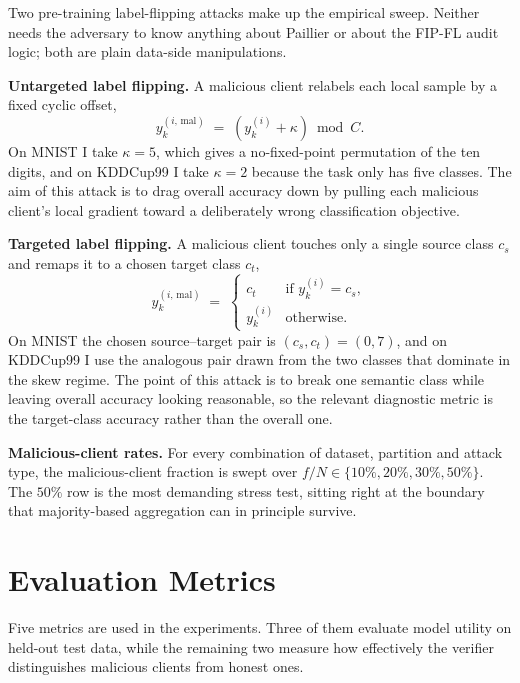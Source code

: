 Two pre-training label-flipping attacks make up the empirical sweep. Neither needs the adversary to know anything about Paillier or about the FIP-FL audit logic; both are plain data-side manipulations.

\noindent\textbf{Untargeted label flipping.} A malicious client relabels each local sample by a fixed cyclic offset,
\begin{equation}
    y_{k}^{(i,\,\text{mal})} \;=\; (y_{k}^{(i)} + \kappa) \bmod C .
\end{equation}
On MNIST I take $\kappa=5$, which gives a no-fixed-point permutation of the ten digits, and on KDDCup99 I take $\kappa=2$ because the task only has five classes. The aim of this attack is to drag overall accuracy down by pulling each malicious client's local gradient toward a deliberately wrong classification objective.

\noindent\textbf{Targeted label flipping.} A malicious client touches only a single source class $c_s$ and remaps it to a chosen target class $c_t$,
\begin{equation}
    y_{k}^{(i,\,\text{mal})} \;=\; \begin{cases}
        c_{t} & \text{if } y_{k}^{(i)} = c_{s}, \\
        y_{k}^{(i)} & \text{otherwise.}
    \end{cases}
\end{equation}
On MNIST the chosen source--target pair is $(c_s,c_t)=(0,7)$, and on KDDCup99 I use the analogous pair drawn from the two classes that dominate in the skew regime. The point of this attack is to break one semantic class while leaving overall accuracy looking reasonable, so the relevant diagnostic metric is the target-class accuracy rather than the overall one.

\noindent\textbf{Malicious-client rates.} For every combination of dataset, partition and attack type, the malicious-client fraction is swept over $f/N\in\{10\%,20\%,30\%,50\%\}$. The $50\%$ row is the most demanding stress test, sitting right at the boundary that majority-based aggregation can in principle survive.

\section{Evaluation Metrics}
\label{sec:setup-metrics}

Five metrics are used in the experiments. Three of them evaluate model utility on held-out test data, while the remaining two measure how effectively the verifier distinguishes malicious clients from honest ones.

